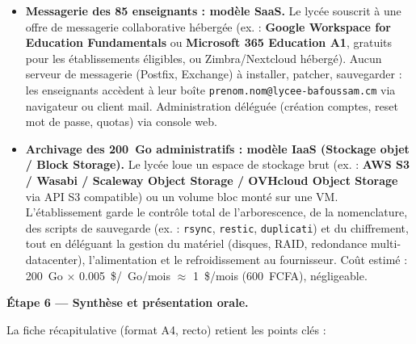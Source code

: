 \documentclass[11pt]{article}
\newcommand{\cle}[1]{{\popxbold\color{popdark}#1}}
\begin{document}
\begin{exoresolu}
\begin{itemize}
  \item \textbf{Messagerie des 85 enseignants : modèle \cle{SaaS}.} 
    Le lycée souscrit à une offre de messagerie collaborative hébergée (ex. : \textbf{Google Workspace for Education Fundamentals} ou \textbf{Microsoft 365 Education A1}, gratuits pour les établissements éligibles, ou Zimbra/Nextcloud hébergé). Aucun serveur de messagerie (Postfix, Exchange) à installer, patcher, sauvegarder : les enseignants accèdent à leur boîte \texttt{prenom.nom@lycee-bafoussam.cm} via navigateur ou client mail. Administration déléguée (création comptes, reset mot de passe, quotas) via console web.
  
  \item \textbf{Archivage des \SI{200}{Go} administratifs : modèle \cle{IaaS} (Stockage objet / Block Storage).} 
    Le lycée loue un espace de stockage brut (ex. : \textbf{AWS S3 / Wasabi / Scaleway Object Storage / OVHcloud Object Storage} via API S3 compatible) ou un volume bloc monté sur une VM. L'établissement garde le contrôle total de l'arborescence, de la nomenclature, des scripts de sauvegarde (ex. : \texttt{rsync}, \texttt{restic}, \texttt{duplicati}) et du chiffrement, tout en déléguant la gestion du matériel (disques, RAID, redondance multi-datacenter), l'alimentation et le refroidissement au fournisseur. Coût estimé : \SI{200}{Go} $\times$ \SI{0.005}{\$}/\SI{}{Go}/mois $\approx$ \SI{1}{\$}/mois (\approx \num{600}~FCFA), négligeable.
\end{itemize}

\textbf{Étape 6 — Synthèse et présentation orale.}

La fiche récapitulative (format A4, recto) retient les points clés :


\end{exoresolu}
\end{document}
